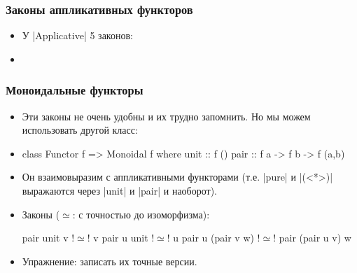\documentclass[11pt]{beamer}
\begin{document}
\begin{frame}[fragile]
  \frametitle{Законы аппликативных функторов}
  \begin{itemize}
    \item У \haskinline|Applicative| 5 законов:
    \item
  \end{itemize}
\end{frame}

\begin{frame}[fragile]
  \frametitle{Моноидальные функторы}
  \begin{itemize}
    \item Эти законы не очень удобны и их трудно запомнить. Но мы можем использовать другой класс:
    \item
          \begin{haskell}
            class Functor f => Monoidal f where
              unit :: f ()
              pair :: f a -> f b -> f (a,b)
          \end{haskell}
    \item Он взаимовыразим с аппликативными функторами (т.е. \haskinline|pure| и \haskinline|(<*>)| выражаются через \haskinline|unit| и \haskinline|pair| и наоборот).
    \item Законы ($\simeq$: с точностью до изоморфизма):
          \begin{haskell}
            pair unit v !$\simeq$! v
            pair u unit !$\simeq$! u
            pair u (pair v w) !$\simeq$! pair (pair u v) w
          \end{haskell}
    \item Упражнение: записать их точные версии.
  \end{itemize}
\end{frame}
\end{document}
